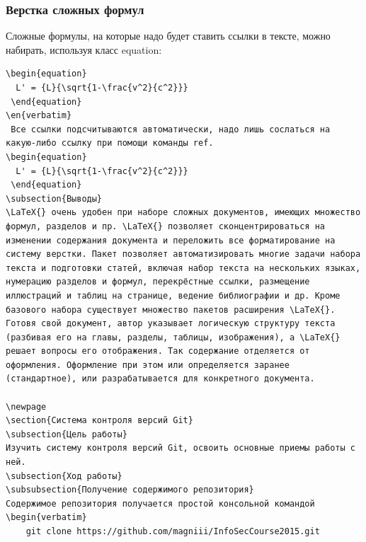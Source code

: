 \documentclass[a4paper, 14pt]{article}				%
\begin{document}
\subsubsection{Верстка сложных формул}
Сложные формулы, на которые надо будет ставить ссылки в тексте, можно набирать, используя класс equation:
\begin{verbatim}
\begin{equation}
  L' = {L}{\sqrt{1-\frac{v^2}{c^2}}}
 \end{equation}
\en{verbatim}
 Все ссылки подсчитываются автоматически, надо лишь сослаться на какую-либо ссылку при помощи команды ref.
\begin{equation}
  L' = {L}{\sqrt{1-\frac{v^2}{c^2}}}
 \end{equation}
\subsection{Выводы}
\LaTeX{} очень удобен при наборе сложных документов, имеющих множество формул, разделов и пр. \LaTeX{} позволяет сконцентрироваться на изменении содержания документа и переложить все форматирование на систему верстки. Пакет позволяет автоматизировать многие задачи набора текста и подготовки статей, включая набор текста на нескольких языках, нумерацию разделов и формул, перекрёстные ссылки, размещение иллюстраций и таблиц на странице, ведение библиографии и др. Кроме базового набора существует множество пакетов расширения \LaTeX{}. Готовя свой документ, автор указывает логическую структуру текста (разбивая его на главы, разделы, таблицы, изображения), а \LaTeX{} решает вопросы его отображения. Так содержание отделяется от оформления. Оформление при этом или определяется заранее (стандартное), или разрабатывается для конкретного документа.

\newpage
\section{Система контроля версий Git}
\subsection{Цель работы}
Изучить систему контроля версий Git, освоить основные приемы работы с ней.
\subsection{Ход работы}
\subsubsection{Получение содержимого репозитория}
Содержимое репозитория получается простой консольной командой 
\begin{verbatim}
	git clone https://github.com/magniii/InfoSecCourse2015.git
\end{verbatim}
\end{document}
